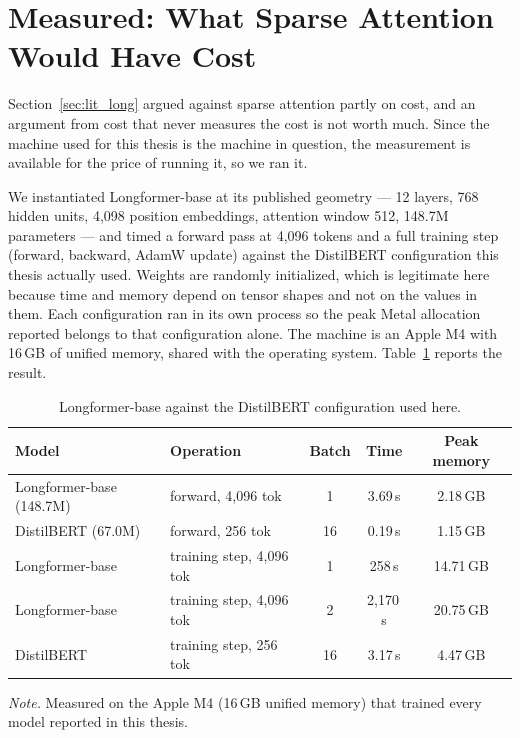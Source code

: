 \section{Measured: What Sparse Attention Would Have Cost}
\label{sec:lfbench}
Section~\ref{sec:lit_long} argued against sparse attention partly on cost, and an argument from cost that never measures the cost is not worth much. Since the machine used for this thesis is the machine in question, the measurement is available for the price of running it, so we ran it.

We instantiated Longformer-base at its published geometry --- 12 layers, 768 hidden units, 4{,}098 position embeddings, attention window 512, 148.7M parameters --- and timed a forward pass at 4{,}096 tokens and a full training step (forward, backward, AdamW update) against the DistilBERT configuration this thesis actually used. Weights are randomly initialized, which is legitimate here because time and memory depend on tensor shapes and not on the values in them. Each configuration ran in its own process so the peak Metal allocation reported belongs to that configuration alone. The machine is an Apple M4 with 16\,GB of unified memory, shared with the operating system. Table~\ref{tab:lfbench} reports the result.

\begin{table}[ht]
\centering
\caption{Longformer-base against the DistilBERT configuration used here.}
\label{tab:lfbench}
\small
\begin{tabular}{llccc}
\toprule
\textbf{Model} & \textbf{Operation} & \textbf{Batch} & \textbf{Time} & \textbf{Peak memory}\\
\midrule
Longformer-base (148.7M) & forward, 4{,}096 tok & 1 & 3.69\,s & 2.18\,GB\\
DistilBERT (67.0M)       & forward, 256 tok     & 16 & 0.19\,s & 1.15\,GB\\
\addlinespace
Longformer-base & training step, 4{,}096 tok & 1 & 258\,s & 14.71\,GB\\
Longformer-base & training step, 4{,}096 tok & 2 & 2{,}170\,s & 20.75\,GB\\
DistilBERT      & training step, 256 tok     & 16 & 3.17\,s & 4.47\,GB\\
\bottomrule
\end{tabular}

{\footnotesize\singlespacing \emph{Note.} Measured on the Apple M4 (16\,GB unified memory) that trained every model reported in this thesis.\par}
\end{table}

